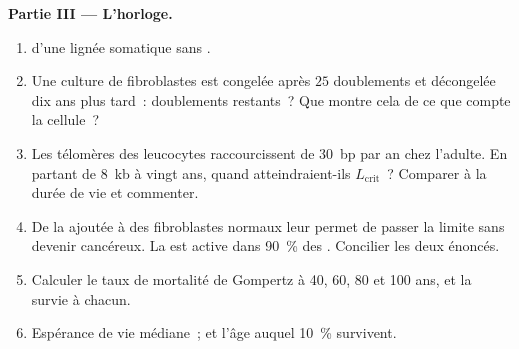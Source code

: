 \begin{problem}
\medskip
\noindent\textbf{Partie III --- L'horloge.}
\begin{enumerate}[resume]
  \item {} d'une lignée somatique sans .
  \item Une culture de fibroblastes est congelée après $25$ doublements
        et décongelée dix ans plus tard~: doublements restants~? Que
        montre cela de ce que compte la cellule~?
  \item Les télomères des leucocytes raccourcissent de \qty{30}{bp} par
        an chez l'adulte. En partant de \qty{8}{kb} à vingt ans, quand
        atteindraient-ils $L_{\text{crit}}$~? Comparer à la durée de vie
        et commenter.
  \item De la  ajoutée à des fibroblastes normaux leur permet
        de passer la limite sans devenir cancéreux. La  est
        active dans \qty{90}{\%} des . Concilier les deux énoncés.
  \item Calculer le taux de mortalité de Gompertz à 40, 60, 80 et 100
        ans, et la survie à chacun.
  \item Espérance de vie médiane~; et l'âge auquel \qty{10}{\%}
        survivent.
\end{enumerate}


\end{problem}
